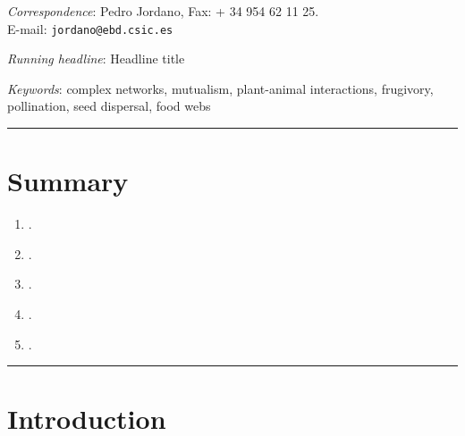 
\def\mytitle{My Title}
\def\myauthor{Pedro Jordano      }
\def\latexaffiliation{Integrative Ecology Group, Estación Biológica de Doñana, Consejo Superior de Investigaciones Científicas (EBD-CSIC), Avenida Americo Vespucio s\slash n, E-41092 Sevilla, Spain}
\def\mydate{August 28, 2015}
\def\latexmode{memoir}
\def\email{jordano@ebd.csic.es}
\def\format{complete}
\def\latexxslt{xhtml2latex.xslt}
\def\bibliocommand{}
\def\bibliographytitle{Bibliography}
\def\bibliostyle{bes}



\emph{Correspondence}: Pedro Jordano, Fax: + 34 954 62 11 25.\\
E-mail: \texttt{jordano@ebd.csic.es} 

\emph{Running headline}: Headline title 

\emph{Keywords}: complex networks, mutualism, plant-animal interactions, frugivory, pollination, seed dispersal, food webs 

\begin{center}\rule{3in}{0.4pt}\end{center}


\section{Summary}
\label{summary}

\begin{enumerate}
\item .

\item .

\item .

\item .

\item .

\end{enumerate}

\begin{center}\rule{3in}{0.4pt}\end{center}


\section{Introduction}
\label{introduction}

